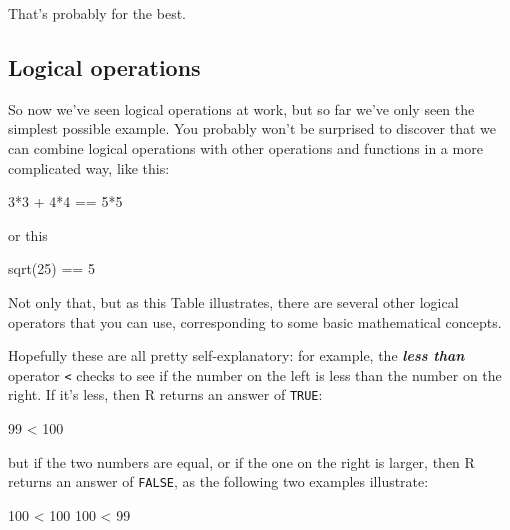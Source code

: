 \documentclass[
]{book}
\newenvironment{Shaded}{\begin{snugshade}}{\end{snugshade}}
\newcommand{\DecValTok}[1]{\textcolor[rgb]{0.00,0.00,0.81}{#1}}
\newcommand{\FunctionTok}[1]{\textcolor[rgb]{0.00,0.00,0.00}{#1}}
\newcommand{\NormalTok}[1]{#1}
\newcommand{\SpecialCharTok}[1]{\textcolor[rgb]{0.00,0.00,0.00}{#1}}
\begin{document}
That's probably for the best.

\hypertarget{logical-operations}{%
\subsection{Logical operations}\label{logical-operations}}

So now we've seen logical operations at work, but so far we've only seen the simplest possible example. You probably won't be surprised to discover that we can combine logical operations with other operations and functions in a more complicated way, like this:

\begin{Shaded}
\begin{Highlighting}[]
\DecValTok{3}\SpecialCharTok{*}\DecValTok{3} \SpecialCharTok{+} \DecValTok{4}\SpecialCharTok{*}\DecValTok{4} \SpecialCharTok{==} \DecValTok{5}\SpecialCharTok{*}\DecValTok{5}
\end{Highlighting}
\end{Shaded}

or this

\begin{Shaded}
\begin{Highlighting}[]
\FunctionTok{sqrt}\NormalTok{(}\DecValTok{25}\NormalTok{) }\SpecialCharTok{==} \DecValTok{5}
\end{Highlighting}
\end{Shaded}

Not only that, but as this Table illustrates, there are several other logical operators that you can use, corresponding to some basic mathematical concepts.

Hopefully these are all pretty self-explanatory: for example, the \textbf{\emph{less than}} operator \texttt{\textless{}} checks to see if the number on the left is less than the number on the right. If it's less, then R returns an answer of \texttt{TRUE}:

\begin{Shaded}
\begin{Highlighting}[]
\DecValTok{99} \SpecialCharTok{\textless{}} \DecValTok{100}
\end{Highlighting}
\end{Shaded}

but if the two numbers are equal, or if the one on the right is larger, then R returns an answer of \texttt{FALSE}, as the following two examples illustrate:

\begin{Shaded}
\begin{Highlighting}[]
\DecValTok{100} \SpecialCharTok{\textless{}} \DecValTok{100}
\DecValTok{100} \SpecialCharTok{\textless{}} \DecValTok{99}
\end{Highlighting}
\end{Shaded}
\end{document}

